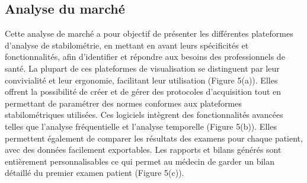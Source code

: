 \subsection{Analyse du marché}

Cette analyse de marché a pour objectif de présenter les différentes 
plateformes d'analyse de stabilométrie, en mettant en avant leurs spécificités et 
fonctionnalités, afin d’identifier et répondre aux besoins des professionnels de 
santé. 
La plupart de ces plateformes de visualisation se distinguent par leur 
convivialité et leur ergonomie, facilitant leur utilisation (Figure 5(a)).  
Elles offrent la possibilité de créer et de gérer des protocoles d’acquisition 
tout en permettant de paramétrer des normes conformes aux plateformes 
stabilométriques utilisées. Ces logiciels intègrent des fonctionnalités avancées 
telles que l’analyse fréquentielle et l’analyse temporelle (Figure 5(b)). Elles 
permettent également de comparer les résultats des examens pour chaque patient, 
avec des données facilement exportables. Les rapports et bilans générés sont 
entièrement personnalisables ce qui permet au médecin de garder un bilan détaillé 
du premier examen patient (Figure 5(c)).

